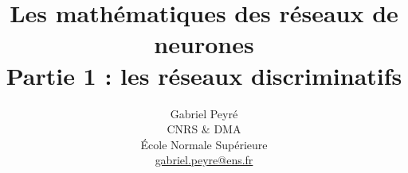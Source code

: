 \documentclass[11pt]{article}
\title{Les mathématiques des réseaux de neurones\\Partie 1 : les réseaux discriminatifs}
\author{%
\begin{tabular}{c}
	Gabriel Peyr{\'e} \\ CNRS \& DMA \\
	 \'Ecole Normale Sup\'erieure \\
	 \url{gabriel.peyre@ens.fr}
\end{tabular}
}
\date{}
\begin{document}
\maketitle

\begin{abstract}

\end{abstract}





\end{document}
